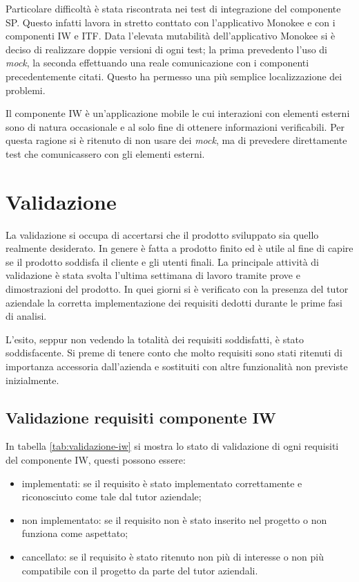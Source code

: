 Particolare difficoltà è stata riscontrata nei test di integrazione del componente SP. Questo infatti lavora in stretto conttato con l'applicativo Monokee e con i componenti IW e ITF. Data l'elevata mutabilità dell'applicativo Monokee si è deciso di realizzare doppie versioni di ogni test; la prima prevedento l'uso di \emph{mock}, la seconda  effettuando una reale comunicazione con i componenti precedentemente citati. Questo ha permesso una più semplice localizzazione dei problemi.

Il componente IW è un'applicazione mobile le cui interazioni con elementi esterni sono di natura occasionale e al solo fine di ottenere informazioni verificabili. Per questa ragione si è ritenuto di non usare dei \emph{mock}, ma di prevedere direttamente test che comunicassero con gli elementi esterni.


\section{Validazione}
La validazione si occupa di accertarsi che il prodotto sviluppato sia quello realmente desiderato. In genere è fatta a prodotto finito ed è utile al fine di capire se il prodotto soddisfa il cliente e gli utenti finali. La principale attività di validazione è stata svolta l'ultima settimana di lavoro tramite prove e dimostrazioni del prodotto. In quei giorni si è verificato con la presenza del tutor aziendale la corretta implementazione dei requisiti dedotti durante le prime fasi di analisi.

L'esito, seppur non vedendo la totalità dei requisiti soddisfatti, è stato soddisfacente. Si preme di tenere conto che molto requisiti sono stati ritenuti di importanza accessoria dall'azienda e sostituiti con altre funzionalità non previste inizialmente.


\subsection{Validazione requisiti componente IW}
In tabella \ref{tab:validazione-iw} si mostra lo stato di validazione di ogni requisiti del componente IW, questi possono essere:
\begin{itemize}
    \item implementati: se il requisito è stato implementato correttamente e riconosciuto come tale dal tutor aziendale;
    \item non implementato: se il requisito non è stato inserito nel progetto o non funziona come aspettato;
    \item cancellato: se il requisito è stato ritenuto non più di interesse o non più compatibile con il progetto da parte del tutor aziendali.
\end{itemize}

